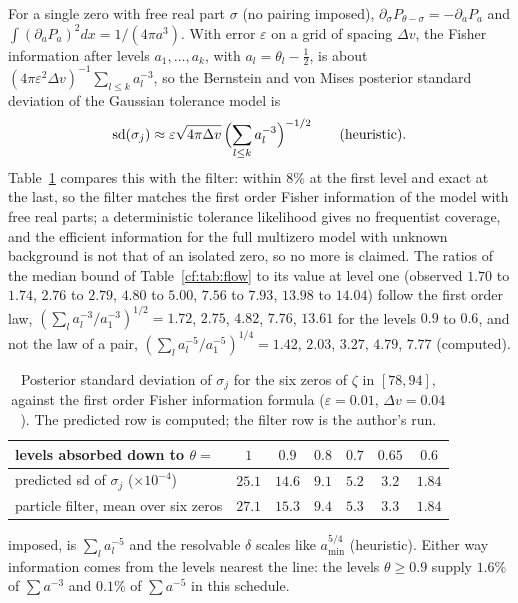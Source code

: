 For a single zero with free real part $\sigma$ (no pairing imposed), $\partial_\sigma P_{\theta-\sigma}=-\partial_aP_a$ and $\int(\partial_aP_a)^2dx=1/(4\pi a^3)$. With error $\varepsilon$ on a grid of spacing $\Delta v$, the Fisher information after levels $a_1,\dots,a_k$, with $a_l=\theta_l-\frac12$, is about $(4\pi\varepsilon^2\Delta v)^{-1}\sum_{l\le k}a_l^{-3}$, so the Bernstein and von Mises posterior standard deviation of the Gaussian tolerance model is
\[
\mathrm{sd}(\sigma_j)\approx\varepsilon\sqrt{4\pi\Delta v}\,\Bigl(\sum_{l\le k}a_l^{-3}\Bigr)^{-1/2}\qquad\text{(heuristic).}
\]
Table~\ref{cf:tab:info} compares this with the filter: within $8\%$ at the first level and exact at the last, so the filter matches the first order Fisher information of the model with free real parts; a deterministic tolerance likelihood gives no frequentist coverage, and the efficient information for the full multizero model with unknown background is not that of an isolated zero, so no more is claimed. The ratios of the median bound of Table~\ref{cf:tab:flow} to its value at level one (observed $1.70$ to $1.74$, $2.76$ to $2.79$, $4.80$ to $5.00$, $7.56$ to $7.93$, $13.98$ to $14.04$) follow the first order law, $(\sum_la_l^{-3}/a_1^{-3})^{1/2}=1.72$, $2.75$, $4.82$, $7.76$, $13.61$ for the levels $0.9$ to $0.6$, and not the law of a pair, $(\sum_la_l^{-5}/a_1^{-5})^{1/4}=1.42$, $2.03$, $3.27$, $4.79$, $7.77$ (computed).

\begin{table}[h]
\centering
\begin{tabular}{lcccccc}
\toprule
levels absorbed down to $\theta=$ & $1$ & $0.9$ & $0.8$ & $0.7$ & $0.65$ & $0.6$\\
\midrule
predicted sd of $\sigma_j$ ($\times10^{-4}$) & $25.1$ & $14.6$ & $9.1$ & $5.2$ & $3.2$ & $1.84$\\
particle filter, mean over six zeros & $27.1$ & $15.3$ & $9.4$ & $5.3$ & $3.3$ & $1.84$\\
\bottomrule
\end{tabular}
\caption{Posterior standard deviation of $\sigma_j$ for the six zeros of $\zeta$ in $[78,94]$, against the first order Fisher information formula ($\varepsilon=0.01$, $\Delta v=0.04$). The predicted row is computed; the filter row is the author's run.}
\label{cf:tab:info}
\end{table}

imposed, is $\sum_la_l^{-5}$ and the resolvable $\delta$ scales like $a_{\min}^{5/4}$ (heuristic). Either way information comes from the levels nearest the line: the levels $\theta\ge0.9$ supply $1.6\%$ of $\sum a^{-3}$ and $0.1\%$ of $\sum a^{-5}$ in this schedule.

